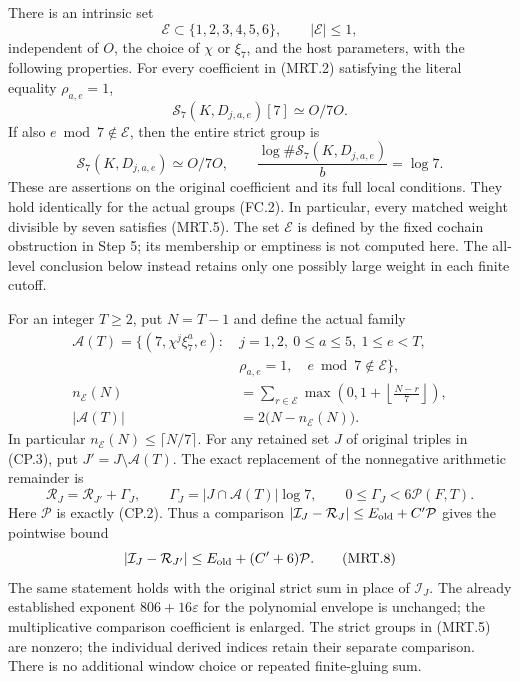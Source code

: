 \begin{theorem}
\label{AC-G219}
There is an intrinsic set
\[
             \mathscr E\subset\{1,2,3,4,5,6\},
             \qquad |\mathscr E|\leq1,                         \tag{MRT.3}
\]
independent of $O$, the choice of $\chi$ or $\xi_7$, and the host
parameters, with the following properties.  For every coefficient
in (MRT.2) satisfying the literal equality $\rho_{a,e}=1$,
\[
                  \mathcal S_7(K,D_{j,a,e})[7]\simeq O/7O.
 \tag{MRT.4}
\]
If also $e\bmod7\notin\mathscr E$, then the entire strict group is
\[
       \mathcal S_7(K,D_{j,a,e})\simeq O/7O,
       \qquad \frac{\log\#\mathcal S_7(K,D_{j,a,e})}{b}=\log7.
 \tag{MRT.5}
\]
These are assertions on the original coefficient and its full local
conditions.  They hold identically for the actual groups (FC.2).
In particular, every matched weight divisible by seven satisfies
(MRT.5).  The set $\mathscr E$ is defined by the fixed cochain
obstruction in Step 5; its membership or emptiness is not computed
here.  The all-level conclusion below instead retains only one possibly
large weight in each finite cutoff.

For an integer $T\geq2$, put $N=T-1$ and define the actual family
\[
 \begin{split}
 \mathcal A(T)=\{(7,\chi^j\xi_7^a,e):\ &j=1,2,
       \ 0\leq a\leq5,\ 1\leq e<T,\\
       &\rho_{a,e}=1,\quad e\bmod7\notin\mathscr E\},\\
 n_{\mathscr E}(N)&=\sum_{r\in\mathscr E}
             \max\left(0,1+\left\lfloor\frac{N-r}{7}\right\rfloor\right),\\
 |\mathcal A(T)|&=2\bigl(N-n_{\mathscr E}(N)\bigr).
 \end{split}                                                   \tag{MRT.6}
\]
In particular $n_{\mathscr E}(N)\leq\lceil N/7\rceil$.
For any retained set $J$ of original triples in (CP.3), put
$J'=J\setminus\mathcal A(T)$.  The exact replacement of the
nonnegative arithmetic remainder is
\[
 \mathcal R_J=\mathcal R_{J'}+\Gamma_J,
 \qquad \Gamma_J=|J\cap\mathcal A(T)|\log7,
 \qquad 0\leq\Gamma_J<6\mathcal P(F,T).                         \tag{MRT.7}
\]
Here $\mathcal P$ is exactly (CP.2).  Thus a comparison
$|\mathcal I_J-\mathcal R_J|\leq E_{\rm old}+C'\mathcal P$
gives the pointwise bound
\[
 |\mathcal I_J-\mathcal R_{J'}|
       \leq E_{\rm old}+(C'+6)\mathcal P.                       \tag{MRT.8}
\]
The same statement holds with the original strict sum in place
of $\mathcal I_J$.  The already established exponent
$806+16\varepsilon$ for the polynomial envelope is unchanged;
the multiplicative comparison coefficient is enlarged.
The strict groups in (MRT.5) are nonzero; the individual derived
indices retain their separate comparison.
There is no additional window choice or repeated finite-gluing sum.


\end{theorem}

